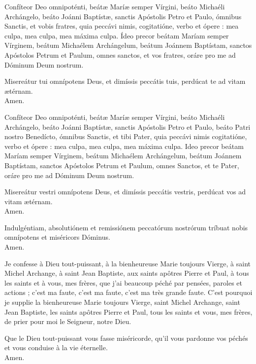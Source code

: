 \documentclass[twoside]{article}
\begin{document}
\begin{paracol}[1]{2}
\switchcolumn*


\vv Confíteor Deo omnipoténti, beátæ Maríæ semper Vírgini, beáto Michaéli Archángelo, beáto Joánni Baptístæ, sanctis Apóstolis Petro et Paulo, ómnibus Sanctis, et vobis fratres, quia peccávi nimis, cogitatióne, verbo et ópere : mea culpa, mea culpa, mea máxima culpa. Ídeo precor beátam Maríam semper Vírginem, beátum Michaélem Archángelum, beátum Joánnem Baptístam, sanctos Apóstolos Petrum et Paulum, omnes sanctos, et vos fratres, oráre pro me ad Dóminum Deum nostrum.

\rr Misereátur tui omnípotens Deus, et dimíssis peccátis tuis, perdúcat te ad vitam ætérnam. \\
\vv Amen.

\rr Confíteor Deo omnipoténti, beátæ Maríæ semper Vírgini, beáto Michaéli Archángelo, beáto Joánni Baptístæ, sanctis Apóstolis Petro et Paulo, beáto Patri nostro Benedícto, ómnibus Sanctis, et tibi Pater, quia peccávi nimis cogitatióne, verbo et ópere : mea culpa, mea culpa, mea máxima culpa.
Ideo precor beátam Maríam semper Vírginem, beátum Michaélem Archángelum, beátum Joánnem Baptístam, sanctos Apóstolos Petrum et Paulum, omnes Sanctos, et te Pater, oráre pro me ad Dóminum Deum nostrum.

\vv Misereátur vestri omnípotens Deus, et dimíssis peccátis vestris, perdúcat vos ad vitam ætérnam. \\
\rr Amen.

\vv Indulgéntiam, \cc absolutiónem et remissiónem peccatórum nostrórum tríbuat nobis omnípotens et miséricors Dóminus. \\
\rr Amen. 

\switchcolumn


\vv Je confesse à Dieu tout-puissant, à la bienheureuse Marie toujours Vierge, à saint Michel Archange, à saint Jean Baptiste, aux saints apôtres Pierre et Paul, à tous les saints et à vous, mes frères, que j’ai beaucoup péché par pensées, paroles et actions ; c’est ma faute, c’est ma faute, c’est ma très grande faute.
C’est pourquoi je supplie la bienheureuse Marie toujours Vierge, saint Michel Archange, saint Jean Baptiste, les saints apôtres Pierre et Paul, tous les saints et vous, mes frères, de prier pour moi le Seigneur, notre Dieu.

\rr Que le Dieu tout-puissant vous fasse miséricorde, qu’il vous pardonne vos péchés et vous conduise à la vie éternelle.\\
\vv Amen.


\end{paracol}
\end{document}
